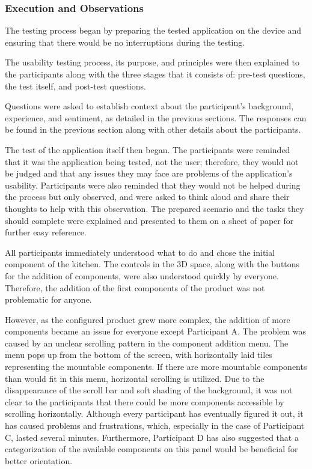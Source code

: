 \subsubsection{Execution and Observations}

The testing process began by preparing the tested application on the device and ensuring that there would be no interruptions during the testing.

The usability testing process, its purpose, and principles were then explained to the participants along with the three stages that it consists of: pre-test questions, the test itself, and post-test questions.

Questions were asked to establish context about the participant's background, experience, and sentiment, as detailed in the previous sections. The responses can be found in the previous section along with other details about the participants.

The test of the application itself then began. The participants were reminded that it was the application being tested, not the user; therefore, they would not be judged and that any issues they may face are problems of the application's usability. Participants were also reminded that they would not be helped during the process but only observed, and were asked to think aloud and share their thoughts to help with this observation. The prepared scenario and the tasks they should complete were explained and presented to them on a sheet of paper for further easy reference. 

All participants immediately understood what to do and chose the initial component of the kitchen. The controls in the 3D space, along with the buttons for the addition of components, were also understood quickly by everyone. Therefore, the addition of the first components of the product was not problematic for anyone. 

However, as the configured product grew more complex, the addition of more components became an issue for everyone except Participant A. The problem was caused by an unclear scrolling pattern in the component addition menu. The menu pops up from the bottom of the screen, with horizontally laid tiles representing the mountable components. If there are more mountable components than would fit in this menu, horizontal scrolling is utilized. Due to the disappearance of the scroll bar and soft shading of the background, it was not clear to the participants that there could be more components accessible by scrolling horizontally. Although every participant has eventually figured it out, it has caused problems and frustrations, which, especially in the case of Participant C, lasted several minutes. Furthermore, Participant D has also suggested that a categorization of the available components on this panel would be beneficial for better orientation. 

